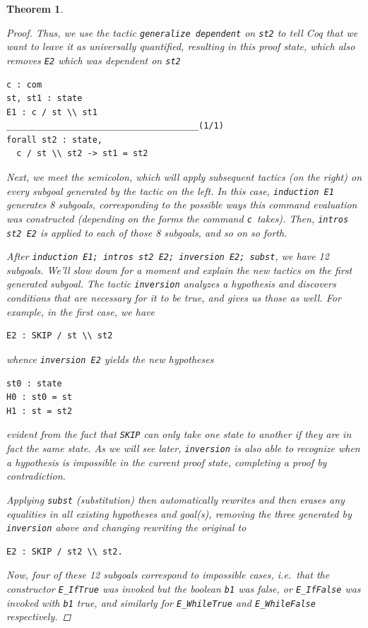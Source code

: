 \documentclass[12pt,notitlepage]{report}
\theoremstyle{plain}
\newtheorem{theo}{Theorem}[section]
\theoremstyle{definition}
\numberwithin{equation}{section}
\begin{document}
\begin{theo}
\begin{proof}
\par Thus, we use the tactic \verb$generalize dependent$ on \verb$st2$ to tell Coq that we want to leave it as universally quantified, resulting in this proof state, which also removes \verb$E2$ which was dependent on \verb$st2$
\begin{verbatim}
c : com
st, st1 : state
E1 : c / st \\ st1
______________________________________(1/1)
forall st2 : state, 
  c / st \\ st2 -> st1 = st2
\end{verbatim}
Next, we meet the semicolon, which will apply subsequent tactics (on the right) on every subgoal generated by the tactic on the left.  In this case, \verb$induction E1$ generates 8 subgoals, corresponding to the possible ways this command evaluation was constructed (depending on the forms the command \verb$c $takes).  Then, \verb$intros st2 E2$ is applied to each of those 8 subgoals, and so on so forth.  
\par After \verb$induction E1; intros st2 E2; inversion E2; subst$, we have 12 subgoals.  We'll slow down for a moment and explain the new tactics on the first generated subgoal.  The tactic \verb$inversion$ analyzes a hypothesis and discovers conditions that are necessary for it to be true, and gives us those as well.  For example, in the first case, we have
\begin{verbatim}
E2 : SKIP / st \\ st2
\end{verbatim}
whence \verb$inversion E2$ yields the new hypotheses
\begin{verbatim}
st0 : state
H0 : st0 = st
H1 : st = st2
\end{verbatim}
evident from the fact that \verb$SKIP$ can only take one state to another if they are in fact the same state.  As we will see later, \verb$inversion$ is also able to recognize when a hypothesis is impossible in the current proof state, completing a proof by contradiction. 
\par Applying \verb$subst$ (substitution) then automatically rewrites and then erases any equalities in all existing hypotheses and goal(s), removing the three generated by \verb$inversion$ above and changing rewriting the original to
\begin{verbatim}
E2 : SKIP / st2 \\ st2.
\end{verbatim}
\par Now, four of these 12 subgoals correspond to impossible cases, i.e.\ that the constructor \verb$E_IfTrue$ was invoked but the boolean \verb$b1$ was false, or \verb$E_IfFalse$ was invoked with \verb$b1$ true, and similarly for \verb$E_WhileTrue$ and \verb$E_WhileFalse$ respectively.  

\end{proof}
\end{theo}
\end{document}
